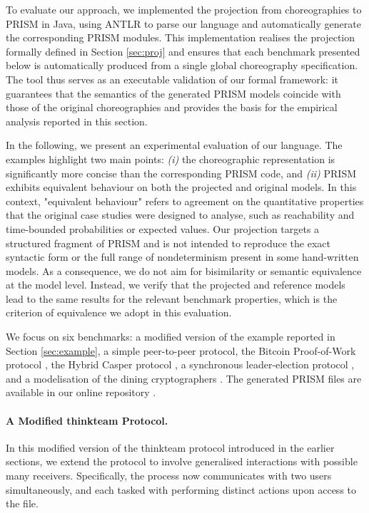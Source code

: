 To evaluate our approach, we implemented the projection from choreographies to PRISM in Java, 
using ANTLR to parse our language and automatically generate the corresponding PRISM modules.
This implementation realises the projection formally defined in Section \ref{sec:proj} 
and ensures that each benchmark presented below is automatically 
produced from a single global choreography specification.
The tool thus serves as an executable validation of our formal framework: 
it guarantees that the semantics of the generated PRISM models 
coincide with those of the original choreographies and 
provides the basis for the empirical analysis reported in this section.

In the following, we present an experimental evaluation of our
language.  The examples highlight two main points: \emph{(i)} the
choreographic representation is significantly more concise than the
corresponding PRISM code, and \emph{(ii)} PRISM exhibits equivalent
behaviour on both the projected and original models.  {In this
  context, "equivalent behaviour" refers to agreement on the
  quantitative properties that the original case studies were designed
  to analyse, such as reachability and time-bounded probabilities or
  expected values.  Our projection targets a structured fragment of
  PRISM and is not intended to reproduce the exact syntactic form or
  the full range of nondeterminism present in some hand-written
  models.  As a consequence, we do not aim for bisimilarity or
  semantic equivalence at the model level.  Instead, we verify that
  the projected and reference models lead to the same results for the
  relevant benchmark properties, which is the criterion of equivalence
  we adopt in this evaluation.}


We focus on six benchmarks: a modified version of the example reported in Section \ref{sec:example}, 
a simple peer-to-peer protocol, 
the Bitcoin Proof-of-Work protocol \cite{DBLP:journals/concurrency/BistarelliNGLMV23}, 
the Hybrid Casper protocol \cite{DBLP:journals/distribledger/GallettaLMV23}, 
a synchronous leader-election protocol \cite{IR90}, 
and a modelisation of the dining cryptographers \cite{Cha88}.
The generated PRISM files are available in our online repository \cite{repository}.

\paragraph{A Modified thinkteam Protocol.}
In this modified version of the thinkteam protocol introduced in the earlier sections, we extend the protocol to involve generalised interactions with possible many receivers. Specifically, the  process now communicates with two users simultaneously,  and  each tasked with performing distinct actions upon access to the file. 

